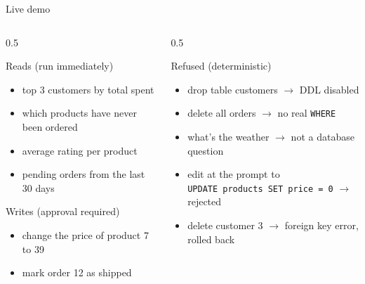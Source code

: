 \documentclass[aspectratio=169,10pt]{beamer}
\begin{document}
\begin{frame}{Live demo}
  \begin{columns}[T]
    \begin{column}{0.5\textwidth}
      \begin{block}{Reads (run immediately)}
        \footnotesize
        \begin{itemize}
          \item top 3 customers by total spent
          \item which products have never been ordered
          \item average rating per product
          \item pending orders from the last 30 days
        \end{itemize}
      \end{block}
      \begin{block}{Writes (approval required)}
        \footnotesize
        \begin{itemize}
          \item change the price of product 7 to 39
          \item mark order 12 as shipped
        \end{itemize}
      \end{block}
    \end{column}
    \begin{column}{0.5\textwidth}
      \begin{alertblock}{Refused (deterministic)}
        \footnotesize
        \begin{itemize}
          \item drop table customers $\rightarrow$ DDL disabled
          \item delete all orders $\rightarrow$ no real \texttt{WHERE}
          \item what's the weather $\rightarrow$ not a database question
          \item edit at the prompt to\\
                \texttt{UPDATE products SET price = 0} $\rightarrow$ rejected
          \item delete customer 3 $\rightarrow$ foreign key error, rolled back
        \end{itemize}
      \end{alertblock}
    \end{column}
  \end{columns}
\end{frame}
\end{document}
